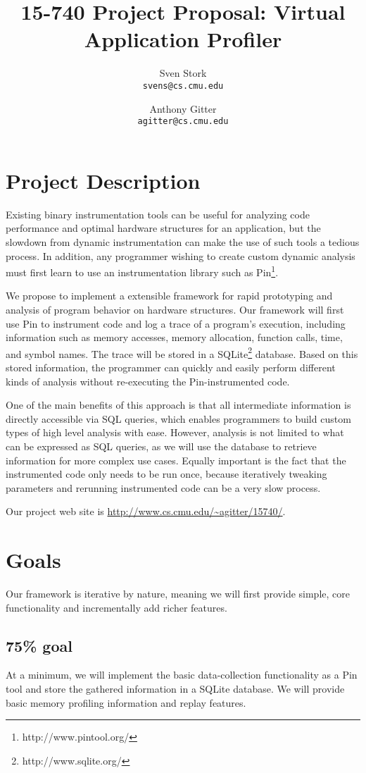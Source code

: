 \documentclass{article}
\title{15-740 Project Proposal: Virtual Application Profiler}
\author{Sven Stork \\ \texttt{svens@cs.cmu.edu}
	\and Anthony Gitter \\ \texttt{agitter@cs.cmu.edu}}
\begin{document}
\maketitle

\section{Project Description}
Existing binary instrumentation tools can be useful for analyzing
code performance and optimal hardware structures for an application,
but the slowdown from dynamic instrumentation can make the use of such tools
a tedious process.  In addition, any programmer wishing to create
custom dynamic analysis must first learn to use an
instrumentation library such as Pin\footnote{http://www.pintool.org/}.

We propose to implement a extensible framework for rapid prototyping
and analysis of program behavior on hardware structures.  Our framework
will first use Pin to instrument code and log a trace of a
program's execution, including information such as memory accesses,
memory allocation, function calls, time, and symbol names.
The trace will be stored in a SQLite\footnote{http://www.sqlite.org/} database.  Based on
this stored information, the programmer can quickly and easily
perform different kinds of analysis without re-executing the
Pin-instrumented code.

One of the main benefits of this approach is that all intermediate
information is directly accessible via SQL queries, which enables
programmers to build custom types of high level analysis with ease.
However, analysis is not limited to what can be expressed as SQL
queries, as we will use the database to retrieve information for
more complex use cases.  Equally important is the fact that the 
instrumented code only needs to be run once, because iteratively
tweaking parameters and rerunning instrumented code can be a
very slow process.

Our project web site is \url{http://www.cs.cmu.edu/~agitter/15740/}.

\section{Goals}
Our framework is iterative by nature, meaning we will first
provide simple, core functionality and incrementally
add richer features.

\subsection*{75\% goal}
At a minimum, we will implement the basic data-collection
functionality as a Pin tool and store the gathered information in a SQLite database.
We will provide basic memory profiling information and replay
features.
\end{document}
